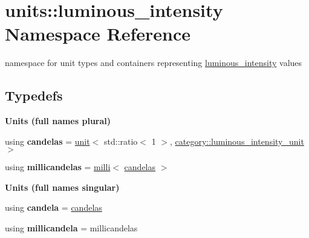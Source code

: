 \hypertarget{namespaceunits_1_1luminous__intensity}{}\section{units\+:\+:luminous\+\_\+intensity Namespace Reference}
\label{namespaceunits_1_1luminous__intensity}


namespace for unit types and containers representing \hyperlink{namespaceunits_1_1luminous__intensity}{luminous\+\_\+intensity} values  


\subsection*{Typedefs}
\begin{Indent}{\bf Units (full names plural)}\par
\begin{DoxyCompactItemize}
\item 
\hypertarget{namespaceunits_1_1luminous__intensity_a39f878d7065bbd00d171d81468ada471}{}using {\bfseries candelas} = \hyperlink{structunits_1_1unit}{unit}$<$ std\+::ratio$<$ 1 $>$, \hyperlink{namespaceunits_1_1category_a5a594dba761bc49d85a99a9a03b5f638}{category\+::luminous\+\_\+intensity\+\_\+unit} $>$\label{namespaceunits_1_1luminous__intensity_a39f878d7065bbd00d171d81468ada471}

\item 
\hypertarget{namespaceunits_1_1luminous__intensity_a6b9145433507a64c97e91af1485961d4}{}using {\bfseries millicandelas} = \hyperlink{group___unit_manipulators_gaec9d1c320e180eb59f3cb3094d8079dd}{milli}$<$ \hyperlink{structunits_1_1unit}{candelas} $>$\label{namespaceunits_1_1luminous__intensity_a6b9145433507a64c97e91af1485961d4}

\end{DoxyCompactItemize}
\end{Indent}
\begin{Indent}{\bf Units (full names singular)}\par
\begin{DoxyCompactItemize}
\item 
\hypertarget{namespaceunits_1_1luminous__intensity_a1b6bd3a7224aba317db638355d5dc676}{}using {\bfseries candela} = \hyperlink{structunits_1_1unit}{candelas}\label{namespaceunits_1_1luminous__intensity_a1b6bd3a7224aba317db638355d5dc676}

\item 
\hypertarget{namespaceunits_1_1luminous__intensity_a15ef8183b20b4942e05ea685bc03e31c}{}using {\bfseries millicandela} = millicandelas\label{namespaceunits_1_1luminous__intensity_a15ef8183b20b4942e05ea685bc03e31c}

\end{DoxyCompactItemize}
\end{Indent}
